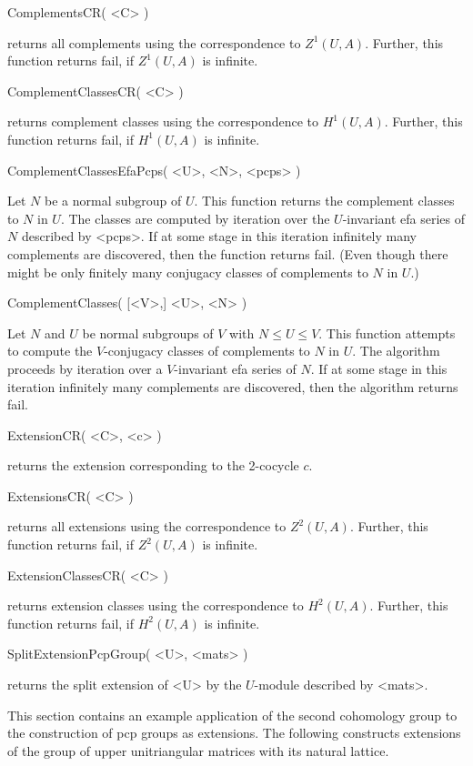 \> ComplementsCR( <C> )

returns all complements using the correspondence to $Z^1(U,A)$. Further, 
this function returns fail, if $Z^1(U,A)$ is infinite.

\> ComplementClassesCR( <C> )

returns complement classes using the correspondence to $H^1(U,A)$. Further, 
this function returns fail, if $H^1(U,A)$ is infinite.

\> ComplementClassesEfaPcps( <U>, <N>, <pcps> )

Let $N$ be a normal subgroup of $U$. This function returns the complement 
classes to $N$ in $U$. The classes are computed by iteration over the 
$U$-invariant efa series of $N$ described by <pcps>. If at some stage in
this iteration infinitely many complements are discovered, then the function
returns fail. (Even though there might be only finitely many conjugacy
classes of complements to $N$ in $U$.)

\> ComplementClasses( [<V>,] <U>, <N> )

Let $N$ and $U$ be normal subgroups of $V$ with $N \leq U \leq V$. This 
function attempts to compute the $V$-conjugacy classes of complements to 
$N$ in $U$. The algorithm proceeds by iteration over a $V$-invariant
efa series of $N$. If at some stage in this iteration infinitely many 
complements are discovered, then the algorithm returns fail. 

\>ExtensionCR( <C>, <c> )

returns the extension corresponding to the 2-cocycle $c$.

\>ExtensionsCR( <C> )  

returns all extensions using the correspondence to $Z^2(U,A)$. Further,
this function returns fail, if $Z^2(U,A)$ is infinite.

\>ExtensionClassesCR( <C> )
        
returns extension classes using the correspondence to $H^2(U,A)$. Further, 
this function returns fail, if $H^2(U,A)$ is infinite.

\>SplitExtensionPcpGroup( <U>, <mats> )

returns the split extension of <U> by the $U$-module described by <mats>.


This section contains an example application of the second cohomology
group to the construction of pcp groups as extensions. The following
constructs extensions of the group of upper unitriangular matrices with
its natural lattice.

